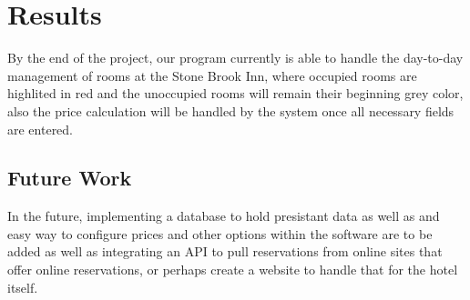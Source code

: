 \documentclass[10pt,conference,onecolumn,compsoc]{IEEEtran}
\begin{document}
\section{Results}
By the end of the project, our program currently is able to handle the day-to-day management of rooms at the Stone Brook Inn, where occupied rooms are highlited in red and the unoccupied rooms will remain their beginning grey color, also the price calculation will be handled by the system once all necessary fields are entered. 

\subsection{Future Work}
In the future, implementing a database to hold presistant data as well as and easy way to configure prices and other options within the software are to be added as well as integrating an API to pull reservations from online sites that offer online reservations, or perhaps create a website to handle that for the hotel itself. 
\end{document}
